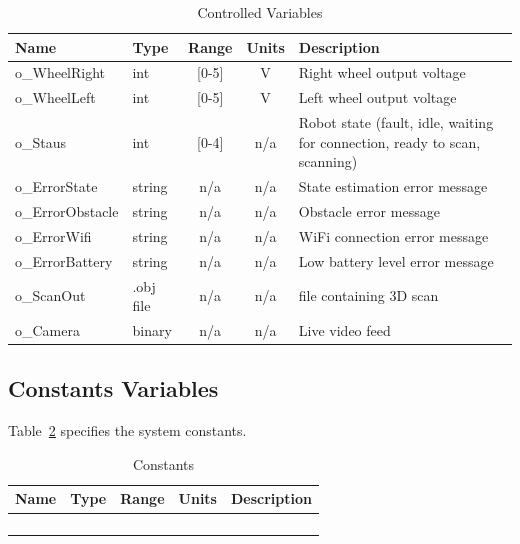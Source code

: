 \documentclass[12pt, titlepage]{article}
\begin{document}
\begin{table}[H]
\caption{Controlled Variables}
\label{Table:c_var}
\begin{tabularx}{\textwidth}{|l|l|c|c|X|}
\hline{\bf Name} & {\bf Type} & \multicolumn{1}{l|}{\bf Range} & \multicolumn{1}{l|}{\bf Units}& {\bf Description}\\
\hline
o\_WheelRight & int & [0-5] & V & Right wheel output voltage \\
\hline
o\_WheelLeft & int & [0-5] & V & Left wheel output voltage \\
\hline
o\_Staus & int & [0-4] & n/a & Robot state (fault, idle, waiting for connection, ready to scan, scanning) \\
\hline
o\_ErrorState & string & n/a & n/a & State estimation error message\\ \hline
o\_ErrorObstacle & string & n/a & n/a & Obstacle error message\\ \hline
o\_ErrorWifi & string & n/a & n/a & WiFi connection error message\\ \hline
o\_ErrorBattery & string & n/a & n/a & Low battery level error message\\ \hline
o\_ScanOut & .obj file & n/a & n/a & file containing 3D scan\\ \hline
o\_Camera & binary & n/a & n/a & Live video feed\\ \hline
\end{tabularx}
\label{Table:c_var}
\end{table}

\subsection{Constants Variables}

Table~\ref{Table:constants} specifies the system constants.

\begin{table}[H]
\caption{Constants}
\label{Table:constants}
\begin{tabularx}{\textwidth}{|l|l|c|c|X|}
\hline{\bf Name} & {\bf Type} & \multicolumn{1}{l|}{\bf Range} & \multicolumn{1}{l|}{\bf Units}& {\bf Description}\\
\hline
 &  &  &  & \\
\hline
 &  &  &  & \\
\hline
 &  &  &  & \\
\hline
 &  &  &  & \\
\hline
\end{tabularx}
\label{Table:constants}
\end{table}
\end{document}
